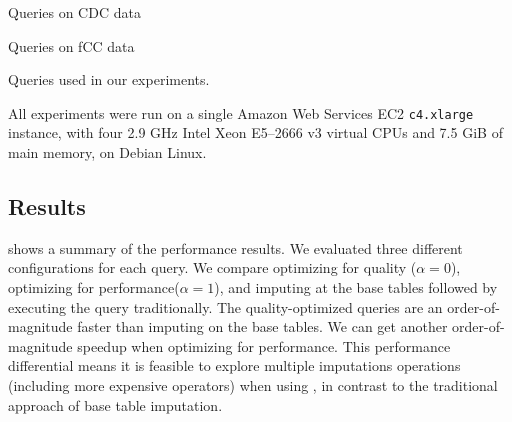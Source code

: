 \begin{table}
  \centering
  \begin{subtable}{\linewidth}
    
    \caption{Queries on CDC data}\label{fig:queries-cdc}
  \end{subtable}
  \par\medskip
  \begin{subtable}{\linewidth}
    
    \caption{Queries on fCC data}\label{fig:queries-fcc}
  \end{subtable}
  \par\medskip
  \caption{Queries used in our experiments.}\label{fig:queries}
\end{table}

%  

All experiments were run on a single Amazon Web Services EC2 {\tt c4.xlarge} instance, with
four 2.9 GHz Intel Xeon E5--2666 v3 virtual CPUs and 7.5 GiB of main memory, on Debian Linux.

\subsection{Results}\label{sec:results}

 shows a summary of the performance results. We evaluated three different
configurations for each query. We compare \ProjectName{} optimizing for quality ($\alpha=0$),
\ProjectName{} optimizing for performance($\alpha=1$), and imputing at the base tables followed
by executing the query traditionally. The quality-optimized queries are an order-of-magnitude
faster than imputing on the base tables. We can get another order-of-magnitude speedup when
optimizing for performance. This performance differential means it is feasible
to explore multiple imputations operations (including more expensive operators) when using
\ProjectName{}, in contrast to the traditional approach of base table imputation.

